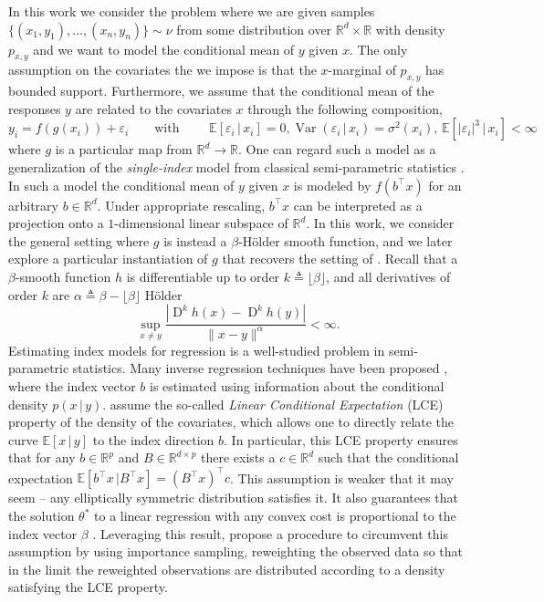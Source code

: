 \documentclass[11pt]{article}
\begin{document}
In this work we consider the problem where we are given samples $\{(x_1, y_1), \dots, (x_n, y_n)\} \sim \nu$ from some distribution over $\mathbb{R}^d\times \mathbb{R}$ with density $p_{x,y}$ and we want to model the conditional mean of $y$ given $x$. The only assumption on the covariates the we impose is that the $x$-marginal of $p_{x,y}$ has bounded support. Furthermore, we assume that the conditional mean of the responses $y$ are related to the covariates $x$ through the following composition,
\begin{equation}
    y_i = f(g(x_i)) + \varepsilon_i \qquad \text{with } \qquad \mathbb{E}[\varepsilon_i \, | \, x_i] = 0, \operatorname{Var}(\varepsilon_i \,| \, x_i) = \sigma^2(x_i),\, \mathbb{E}[|\varepsilon_i|^3 \, |\, x_i] < \infty \label{eq: the model}
\end{equation}
where $g$ is a particular map from $\mathbb{R}^d \rightarrow \mathbb{R}$. One can regard such a model as a generalization of the \textit{single-index} model from classical semi-parametric statistics \cite{gyorfi2002distribution}. In such a model the conditional mean of $y$ given $x$ is modeled by $f(b^{\top}x)$ for an arbitrary $b\in \mathbb{R}^d$. Under appropriate rescaling, $b^{\top}x$ can be interpreted as a projection onto a $1$-dimensional linear subspace of $\mathbb{R}^d$. In this work, we consider the general setting where $g$ is instead a $\beta$-H\"older smooth function, and we later explore a particular instantiation of $g$ that recovers the setting of \citep{wu2024conditional}. Recall that a $\beta$-smooth function $h$ is differentiable up to order $k \triangleq\lfloor{\beta}\rfloor$, and all derivatives of order $k$ are $\alpha \triangleq \beta - \lfloor \beta \rfloor$ H\"older
\[\sup_{x \neq y}\frac{|\operatorname{D}^{k}h(x) - \operatorname{D}^k h(y)|}{\|x - y\|^\alpha} < \infty.\]
Estimating index models for regression is a well-studied problem in semi-parametric statistics. Many inverse regression techniques have been proposed \cite{li1991sliced, li2005contour, li2007directional, dennis2000save}, where the index vector $b$ is estimated using information about the conditional density $p(x \, |\, y)$. \citet{li1991sliced} assume the so-called \textit{Linear Conditional Expectation} (LCE) property of the density of the covariates, which allows one to directly relate the curve $\mathbb{E}[x\,|\,y]$ to the index direction $b$. In particular, this LCE property ensures that for any $b \in \mathbb{R}^p$ and $B \in \mathbb{R}^{d\times p}$ there exists a $c \in \mathbb{R}^d$ such that the conditional expectation $\mathbb{E}[b^{\top}x \, | B^{\top}x] = (B^{\top}x)^{\top} c$. This assumption is weaker that it may seem -- any elliptically symmetric distribution satisfies it. It also guarantees that the solution $\theta^*$ to a linear regression with any convex cost is proportional to the index vector $\beta$ \cite{li1989regression}. Leveraging this result, \citet{Newey_Ruud_2005} propose a procedure to circumvent this assumption by using importance sampling, reweighting the observed data so that in the limit the reweighted observations are distributed according to a density satisfying the LCE property. 
\end{document}
